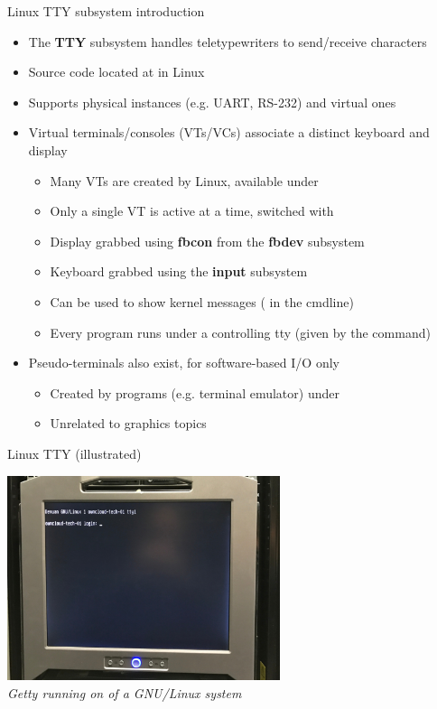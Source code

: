 \begin{frame}{Linux TTY subsystem introduction}
  \begin{itemize}
  \item The \textbf{TTY} subsystem handles teletypewriters to send/receive characters
  \item Source code located at  in Linux
  \item Supports physical instances (e.g. UART, RS-232) and virtual ones
  \item Virtual terminals/consoles (VTs/VCs) associate a distinct keyboard and display
    \begin{itemize}
    \item Many VTs are created by Linux, available under 
    \item Only a single VT is active at a time, switched with 
    \item Display grabbed using \textbf{fbcon} from the \textbf{fbdev} subsystem
    \item Keyboard grabbed using the \textbf{input} subsystem
    \item Can be used to show kernel messages ( in the cmdline)
    \item Every program runs under a controlling tty (given by the  command)
    \end{itemize}
  \item Pseudo-terminals also exist, for software-based I/O only
    \begin{itemize}
    \item Created by programs (e.g. terminal emulator) under 
    \item Unrelated to graphics topics
    \end{itemize}
  \end{itemize}
\end{frame}

\begin{frame}{Linux TTY (illustrated)}
  \begin{center}
    \includegraphics[width=0.6\textwidth]{slides/graphics-software/getty.jpg}\\
    \textit{Getty running on  of a GNU/Linux system}\\
  \end{center}
\end{frame}


